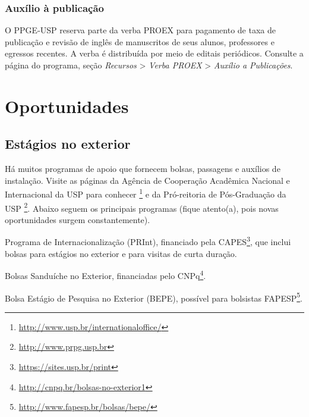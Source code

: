 \subsection{Auxílio à publicação}

O PPGE-USP reserva parte da verba PROEX para pagamento de taxa de
publicação e revisão de inglês de manuscritos de seus alunos,
professores e egressos recentes. A verba é distribuída por
meio de editais periódicos. Consulte a página do programa, seção
\emph{Recursos} \textgreater{} \emph{Verba PROEX} \textgreater{} \emph{Auxílio a
Publicações}.




\chapter{Oportunidades}
\label{sec:oport}

\section{Estágios no exterior}
Há muitos programas de apoio que fornecem bolsas, passagens e auxílios
de instalação. Visite as páginas da Agência de Cooperação Acadêmica
Nacional e Internacional da USP para conhecer
\footnote{\url{http://www.usp.br/internationaloffice/}} e da
Pró-reitoria de Pós-Graduação da USP
\footnote{\url{http://www.prpg.usp.br}}. Abaixo seguem os principais
programas (fique atento(a), pois novas oportunidades surgem
constantemente).
\begin{description}
\item Programa de Internacionalização (PRInt), financiado pela
  CAPES\footnote{\url{https://sites.usp.br/print}}, que inclui bolsas
  para estágios no exterior e para visitas de curta duração.
\item Bolsas Sanduíche no Exterior, financiadas pelo
  CNPq\footnote{\url{http://cnpq.br/bolsas-no-exterior1}}.
\item Bolsa Estágio de Pesquisa no Exterior (BEPE), possível para
  bolsistas FAPESP\footnote{\url{http://www.fapesp.br/bolsas/bepe/}}.
\end{description}

